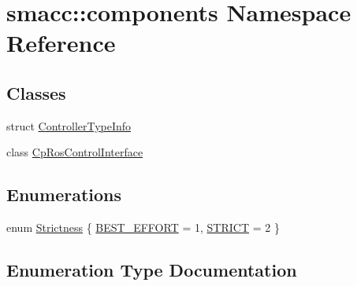 \hypertarget{namespacesmacc_1_1components}{}\section{smacc\+:\+:components Namespace Reference}
\label{namespacesmacc_1_1components}
\subsection*{Classes}
\begin{DoxyCompactItemize}
\item 
struct \hyperlink{structsmacc_1_1components_1_1ControllerTypeInfo}{Controller\+Type\+Info}
\item 
class \hyperlink{classsmacc_1_1components_1_1CpRosControlInterface}{Cp\+Ros\+Control\+Interface}
\end{DoxyCompactItemize}
\subsection*{Enumerations}
\begin{DoxyCompactItemize}
\item 
enum \hyperlink{namespacesmacc_1_1components_a18117d6a71feb2471fb4e07f47674e4c}{Strictness} \{ \hyperlink{namespacesmacc_1_1components_a18117d6a71feb2471fb4e07f47674e4cac068971243fbd65b8e03256ec6cc3ca7}{B\+E\+S\+T\+\_\+\+E\+F\+F\+O\+RT} = 1, 
\hyperlink{namespacesmacc_1_1components_a18117d6a71feb2471fb4e07f47674e4ca659b52150977b11ffc0fa1d7f1f30a01}{S\+T\+R\+I\+CT} = 2
 \}
\end{DoxyCompactItemize}


\subsection{Enumeration Type Documentation}

